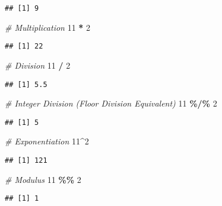 \documentclass[
]{book}
\newenvironment{Shaded}{\begin{snugshade}}{\end{snugshade}}
\newcommand{\CommentTok}[1]{\textcolor[rgb]{0.56,0.35,0.01}{\textit{#1}}}
\newcommand{\DecValTok}[1]{\textcolor[rgb]{0.00,0.00,0.81}{#1}}
\newcommand{\SpecialCharTok}[1]{\textcolor[rgb]{0.81,0.36,0.00}{\textbf{#1}}}
\theoremstyle{definition}
\theoremstyle{definition}
\theoremstyle{definition}
\theoremstyle{definition}
\theoremstyle{remark}
\begin{document}
\begin{verbatim}
## [1] 9
\end{verbatim}

\begin{Shaded}
\begin{Highlighting}[]
\CommentTok{\# Multiplication}
\DecValTok{11} \SpecialCharTok{*} \DecValTok{2}
\end{Highlighting}
\end{Shaded}

\begin{verbatim}
## [1] 22
\end{verbatim}

\begin{Shaded}
\begin{Highlighting}[]
\CommentTok{\# Division}
\DecValTok{11} \SpecialCharTok{/} \DecValTok{2}
\end{Highlighting}
\end{Shaded}

\begin{verbatim}
## [1] 5.5
\end{verbatim}

\begin{Shaded}
\begin{Highlighting}[]
\CommentTok{\# Integer Division (Floor Division Equivalent)}
\DecValTok{11} \SpecialCharTok{\%/\%} \DecValTok{2}
\end{Highlighting}
\end{Shaded}

\begin{verbatim}
## [1] 5
\end{verbatim}

\begin{Shaded}
\begin{Highlighting}[]
\CommentTok{\# Exponentiation}
\DecValTok{11}\SpecialCharTok{\^{}}\DecValTok{2}
\end{Highlighting}
\end{Shaded}

\begin{verbatim}
## [1] 121
\end{verbatim}

\begin{Shaded}
\begin{Highlighting}[]
\CommentTok{\# Modulus}
\DecValTok{11} \SpecialCharTok{\%\%} \DecValTok{2}
\end{Highlighting}
\end{Shaded}

\begin{verbatim}
## [1] 1
\end{verbatim}
\end{document}
